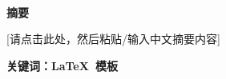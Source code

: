\newpage
\clearpage
\cleardoublepage
\setcounter{page}{1}
\begin{center}
\vspace*{1.3mm}
\heiti\fontsize{16}{16}\textbf{\mytitle}\\
\vspace{11mm}
\fontsize{15}{15}
\textbf{摘}\hspace{5.3mm}\textbf{要}
\end{center}
\vspace{4.5mm}
\fontsize{14}{20}\selectfont
\noindent\phantom{空格}%
[请点击此处，然后粘贴/输入中文摘要内容]





\vspace{11.5mm}%

\noindent\phantom{空格}\heiti\textbf{%
	关键词：\LaTeX\ 模板
}